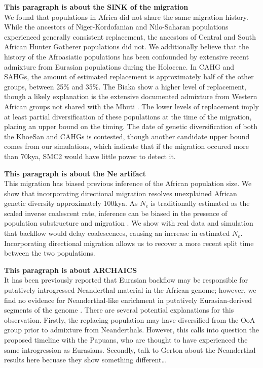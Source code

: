 \documentclass{article}
\begin{document}
{\bf This paragraph is about the SINK of the migration} \\
We found that populations in Africa did not share the same migration history. While the ancestors of Niger-Kordofanian and Nilo-Saharan populations experienced generally consistent replacement, the ancestors of Central and South African Hunter Gatherer populations did not. We additionally believe that the history of the Afroasiatic populations has been confounded by extensive recent admixture from Eurasian populations during the Holocene. In CAHG and SAHGs, the amount of estimated replacement is approximately half of the other groups, between 25\% and 35\%. The Biaka show a higher level of replacement, though a likely explanation is the extensive documented admixture from Western African groups not shared with the Mbuti \cite{Chen2020, Batini2011}. The lower levels of replacement imply at least partial diversification of these populations at the time of the migration, placing an upper bound on the timing. The date of genetic diversification of both the KhoeSan and CAHGs is contested, though another candidate upper bound comes from our simulations, which indicate that if the migration occured more than 70kya, SMC2 would have little power to detect it. 

{\bf This paragraph is about the Ne artifact} \\
This migration has biased previous inference of the African population size. We show that incorporating directional migration resolves unexplained African genetic diversity approximately 100kya. As $N_e$ is traditionally estimated as the scaled inverse coalescent rate, inference can be biased in the presence of population substructure and migration \cite{Chikhi2018, Li2011}. We show with real data and simulation that backflow would delay coalescences, causing an increase in estimated $N_e$. Incorporating directional migration allows us to recover a more recent split time between the two populations. 

{\bf This paragraph is about ARCHAICS} \\
It has been previously reported that Eurasian backflow may be responsible for putatively introgressed Neanderthal material in the African genome; however, we find no evidence for Neanderthal-like enrichment in putatively Eurasian-derived segments of the genome \cite{Chen2020}. There are several potential explanations for this observation. Firstly, the replacing population may have diversified from the OoA group prior to admixture from Neanderthals. However, this calls into question the proposed timeline with the Papuans, who are thought to have experienced the same introgression as Eurasians. Secondly, {\color{red} talk to Gerton about the Neanderthal results here becuase they show something different\dots}  
\end{document}
